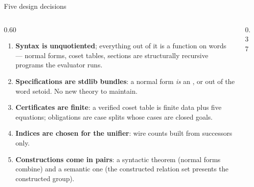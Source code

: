 \begin{frame}{Five design decisions \InPaper}
\begin{columns}[c]
\begin{column}{0.60\textwidth}
\begin{enumerate}
  \setlength{\itemsep}{2pt}
  \item \textbf{Syntax is unquotiented}; everything out of it is a function
        on words --- normal forms, coset tables, sections are structurally
        recursive programs the evaluator runs.
  \item \textbf{Specifications are stdlib bundles}: a normal form \emph{is}
        an ,  or  out of the
        word setoid. No new theory to maintain.
  \item \textbf{Certificates are finite}: a verified coset table is finite
        data plus five equations; obligations are case splits whose cases
        are closed goals.
  \item \textbf{Indices are chosen for the unifier}: wire counts built from
        successors only.
  \item \textbf{Constructions come in pairs}: a syntactic theorem (normal
        forms combine) and a semantic one (the constructed relation set
        presents the constructed group).
\end{enumerate}
\end{column}
\begin{column}{0.37\textwidth}
\centering
{}
\end{column}
\end{columns}
\end{frame}

